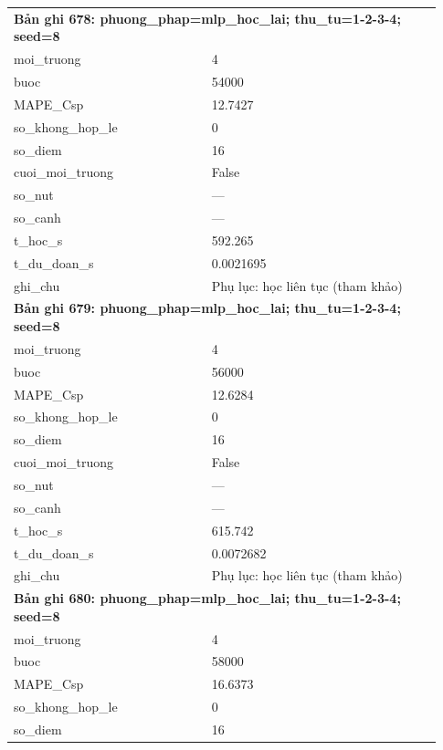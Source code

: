 \begin{longtable}{p{0.43\linewidth}p{0.50\linewidth}}
\midrule
\multicolumn{2}{p{0.95\linewidth}}{\textbf{Bản ghi 678: phuong\_phap=mlp\_hoc\_lai; thu\_tu=1-2-3-4; seed=8}} \\
moi\_\allowbreak truong & 4 \\
buoc & 54000 \\
MAPE\_\allowbreak Csp & 12.7427 \\
so\_\allowbreak khong\_\allowbreak hop\_\allowbreak le & 0 \\
so\_\allowbreak diem & 16 \\
cuoi\_\allowbreak moi\_\allowbreak truong & False \\
so\_\allowbreak nut & — \\
so\_\allowbreak canh & — \\
t\_\allowbreak hoc\_\allowbreak s & 592.265 \\
t\_\allowbreak du\_\allowbreak doan\_\allowbreak s & 0.0021695 \\
ghi\_\allowbreak chu & Phụ lục: học liên tục (tham khảo) \\
\midrule
\multicolumn{2}{p{0.95\linewidth}}{\textbf{Bản ghi 679: phuong\_phap=mlp\_hoc\_lai; thu\_tu=1-2-3-4; seed=8}} \\
moi\_\allowbreak truong & 4 \\
buoc & 56000 \\
MAPE\_\allowbreak Csp & 12.6284 \\
so\_\allowbreak khong\_\allowbreak hop\_\allowbreak le & 0 \\
so\_\allowbreak diem & 16 \\
cuoi\_\allowbreak moi\_\allowbreak truong & False \\
so\_\allowbreak nut & — \\
so\_\allowbreak canh & — \\
t\_\allowbreak hoc\_\allowbreak s & 615.742 \\
t\_\allowbreak du\_\allowbreak doan\_\allowbreak s & 0.0072682 \\
ghi\_\allowbreak chu & Phụ lục: học liên tục (tham khảo) \\
\midrule
\multicolumn{2}{p{0.95\linewidth}}{\textbf{Bản ghi 680: phuong\_phap=mlp\_hoc\_lai; thu\_tu=1-2-3-4; seed=8}} \\
moi\_\allowbreak truong & 4 \\
buoc & 58000 \\
MAPE\_\allowbreak Csp & 16.6373 \\
so\_\allowbreak khong\_\allowbreak hop\_\allowbreak le & 0 \\
so\_\allowbreak diem & 16 \\

\end{longtable}
